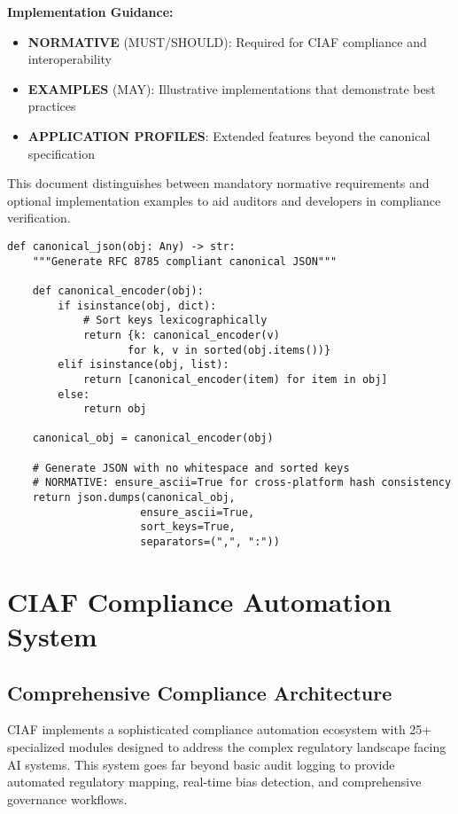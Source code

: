 \documentclass[12pt,a4paper]{article}
\begin{document}
\begin{tcolorbox}[colframe=blue!50, colback=blue!5, title={\textbf{Normative vs. Example Content}}]
\textbf{Implementation Guidance:}
\begin{itemize}
\item \textbf{NORMATIVE} (MUST/SHOULD): Required for CIAF compliance and interoperability
\item \textbf{EXAMPLES} (MAY): Illustrative implementations that demonstrate best practices
\item \textbf{APPLICATION PROFILES}: Extended features beyond the canonical specification
\end{itemize}
This document distinguishes between mandatory normative requirements and optional implementation examples to aid auditors and developers in compliance verification.
\end{tcolorbox}

\begin{lstlisting}[caption=Canonical JSON Implementation]
def canonical_json(obj: Any) -> str:
    """Generate RFC 8785 compliant canonical JSON"""
    
    def canonical_encoder(obj):
        if isinstance(obj, dict):
            # Sort keys lexicographically
            return {k: canonical_encoder(v) 
                   for k, v in sorted(obj.items())}
        elif isinstance(obj, list):
            return [canonical_encoder(item) for item in obj]
        else:
            return obj
    
    canonical_obj = canonical_encoder(obj)
    
    # Generate JSON with no whitespace and sorted keys
    # NORMATIVE: ensure_ascii=True for cross-platform hash consistency
    return json.dumps(canonical_obj, 
                     ensure_ascii=True,
                     sort_keys=True,
                     separators=(",", ":"))
\end{lstlisting}

\section{CIAF Compliance Automation System}

\subsection{Comprehensive Compliance Architecture}

CIAF implements a sophisticated compliance automation ecosystem with 25+ specialized modules designed to address the complex regulatory landscape facing AI systems. This system goes far beyond basic audit logging to provide automated regulatory mapping, real-time bias detection, and comprehensive governance workflows.
\end{document}
